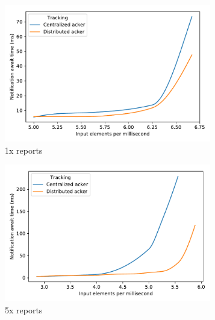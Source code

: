 \begin{figure}[t!]
    \begin{subfigure}[b]{0.30\textwidth}
            \includegraphics[width=0.99\textwidth]{Chapters/Tracker/pics/scalability_01x.pdf}
            \caption{1x reports}
            \label{1x_acks}
    \end{subfigure}
    \hspace{5mm}
    \begin{subfigure}[b]{0.30\textwidth}
            \includegraphics[width=0.99\textwidth]{Chapters/Tracker/pics/scalability_05x.pdf}
            \caption{5x reports}
            \label{5x_acks}
    \end{subfigure}
    \hspace{5mm}
    \begin{subfigure}[b]{0.30\textwidth}

\end{subfigure}
\end{figure}
